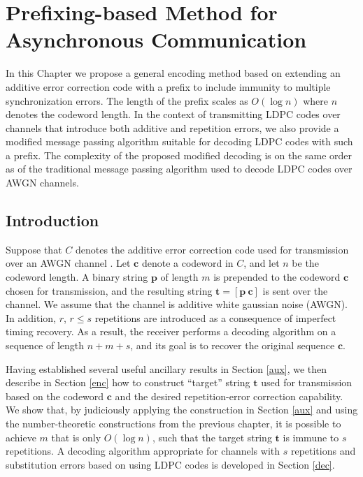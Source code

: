 \chapter[Prefixing-based Method for Asynchronous Communication]{Prefixing-based Method for Asynchronous
Communication}\label{prefixing}

In this Chapter  we propose a general encoding method based on
extending an additive error correction code with a prefix to
include immunity to multiple synchronization errors. The length of
the prefix scales as $O(\log n)$ where $n$ denotes the codeword
length. In the context of transmitting LDPC codes over channels
that introduce both additive and repetition errors, we also
provide a modified message passing algorithm suitable for decoding
LDPC codes with such a prefix. The complexity of the proposed
modified decoding is on the same order as of the traditional
message passing algorithm used to decode LDPC codes over AWGN
channels.
\section{Introduction}

Suppose that $C$ denotes the additive error correction code used
for transmission over an AWGN channel . Let $\mathbf{c}$ denote a
codeword in $C$, and let $n$ be the codeword length. A binary
string $\mathbf{p}$ of length $m$ is prepended to the codeword
$\mathbf{c}$ chosen for transmission, and the resulting string
$\mathbf{t}=[\mathbf{p}~ \mathbf{c}]$ is sent over the channel. We
assume that the channel is additive white gaussian noise (AWGN).
In addition, $r$, $r \leq s$ repetitions are introduced as a
consequence of imperfect timing recovery. As a result, the
receiver performs a decoding algorithm on a sequence of length
$n+m+s$, and its goal is to recover the original sequence
$\mathbf{c}$.


Having established several useful ancillary results in Section
\ref{aux}, we then describe in Section \ref{enc} how to construct
``target'' string $\mathbf{t}$ used for transmission based on the
codeword $\mathbf{c}$ and the desired repetition-error correction
capability. We show that, by judiciously applying the construction
in Section \ref{aux} and using the number-theoretic constructions
from the previous chapter, it is possible to achieve $m$ that is
only $O(\log n)$, such that the target string $\mathbf{t}$ is
immune to $s$ repetitions. A decoding algorithm appropriate for
channels with $s$ repetitions and substitution errors based on
using LDPC codes is developed in Section \ref{dec}.

